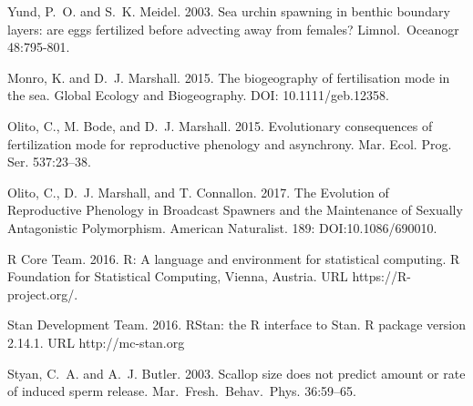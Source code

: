 \documentclass{article}
\begin{document}
\begin{thebibliography}{}
Yund, P.~O. and S.~K. Meidel. 2003.
\newblock Sea urchin spawning in benthic boundary layers: are eggs fertilized before advecting away from females?
\newblock Limnol.~Oceanogr 48:795-801.

Monro, K. and D.~J. Marshall. 2015.
\newblock The biogeography of fertilisation mode in the sea.
\newblock Global Ecology and Biogeography. DOI: 10.1111/geb.12358.

Olito, C., M. Bode, and D.~J. Marshall. 2015.
\newblock Evolutionary consequences of fertilization mode for reproductive phenology and asynchrony.
\newblock Mar. Ecol. Prog. Ser. 537:23--38.

Olito, C., D.~J. Marshall, and T. Connallon. 2017.
\newblock The Evolution of Reproductive Phenology in Broadcast Spawners and the Maintenance of Sexually Antagonistic Polymorphism.
\newblock American Naturalist. 189: DOI:10.1086/690010.

R Core Team. 2016.
\newblock R: A language and environment for statistical computing. 
\newblock R Foundation for Statistical Computing, Vienna, Austria. URL https://R-project.org/.

Stan Development Team. 2016.
\newblock RStan: the R interface to Stan.
\newblock R package version 2.14.1. URL http://mc-stan.org

Styan, C.~A. and A.~J. Butler. 2003.
\newblock Scallop size does not predict amount or rate of induced sperm release.
\newblock Mar.~Fresh.~Behav.~Phys. 36:59--65.

\end{thebibliography}

\newpage{}
\end{document}
